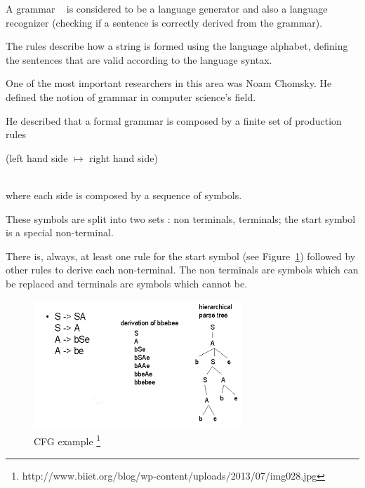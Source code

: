 \documentclass[
  oneside,
  11pt, a4paper,
  footinclude=true,
  headinclude=true,
  cleardoublepage=empty
]{scrbook}
\begin{document}
A grammar ~\citep{DJB88a,Alb91a,Kas91a,SV91a,WAGA90,Rai80a,Fil83a,OPHCC2010} is considered to be a language generator and also a language recognizer (checking if a sentence is correctly derived from the grammar).

The rules describe how a string is formed using the language alphabet, defining the sentences that are valid according to the language syntax.

One of the most important researchers in this area was Noam Chomsky. He defined the notion of grammar in computer science's field.

He described that a formal grammar is composed by a finite set of production rules \\
\centerline{(left hand side $\mapsto$ right hand side)} \\
where each side is composed by a sequence of symbols.

These symbols are split into two sets : non terminals, terminals; the start symbol is a special non-terminal.





There is, always, at least one rule for the start symbol (see Figure~\ref{fig:CFG}) followed by other rules to derive each non-terminal.
The non terminals are symbols which can be replaced and terminals are symbols which cannot be.

\begin{figure}[h!]
  \centering
    \includegraphics[width=0.7\textwidth]{img/GIC2.png}
    \caption{CFG example \protect\footnote{http://www.biiet.org/blog/wp-content/uploads/2013/07/img028.jpg}}
    \label{fig:CFG}
\end{figure}
\end{document}
